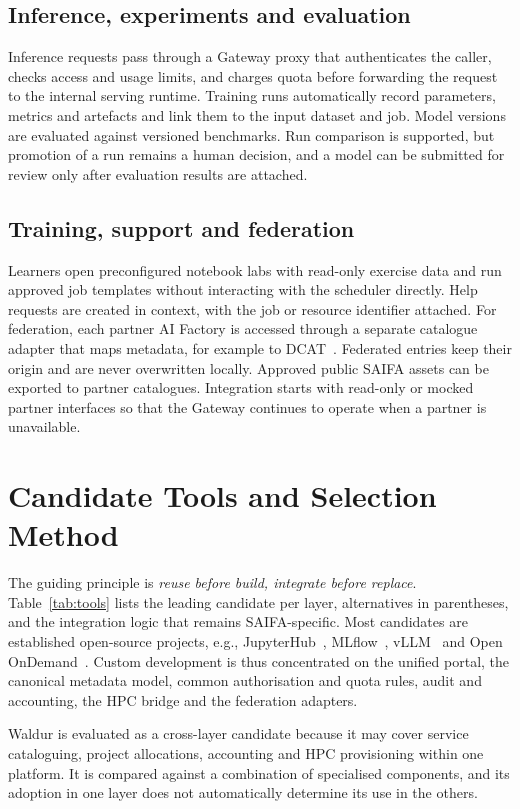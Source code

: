 \documentclass[conference,a4paper]{IEEEtran}
\begin{document}
\subsection{Inference, experiments and evaluation}
Inference requests pass through a Gateway proxy that authenticates the caller, checks access and usage limits, and charges quota before forwarding the request to the internal serving runtime. Training runs automatically record parameters, metrics and artefacts and link them to the input dataset and job. Model versions are evaluated against versioned benchmarks. Run comparison is supported, but promotion of a run remains a human decision, and a model can be submitted for review only after evaluation results are attached.

\subsection{Training, support and federation}
Learners open preconfigured notebook labs with read-only exercise data and run approved job templates without interacting with the scheduler directly. Help requests are created in context, with the job or resource identifier attached. For federation, each partner AI Factory is accessed through a separate catalogue adapter that maps metadata, for example to DCAT~\cite{w3c_dcat3}. Federated entries keep their origin and are never overwritten locally. Approved public SAIFA assets can be exported to partner catalogues. Integration starts with read-only or mocked partner interfaces so that the Gateway continues to operate when a partner is unavailable.

\section{Candidate Tools and Selection Method}

The guiding principle is \emph{reuse before build, integrate before replace}. Table~\ref{tab:tools} lists the leading candidate per layer, alternatives in parentheses, and the integration logic that remains SAIFA-specific. Most candidates are established open-source projects, e.g., JupyterHub~\cite{kluyver2016jupyter}, MLflow~\cite{zaharia2018mlflow}, vLLM~\cite{kwon2023vllm} and Open OnDemand~\cite{hudak2018ood}. Custom development is thus concentrated on the unified portal, the canonical metadata model, common authorisation and quota rules, audit and accounting, the HPC bridge and the federation adapters.

Waldur is evaluated as a cross-layer candidate because it may cover service cataloguing, project allocations, accounting and HPC provisioning within one platform. It is compared against a combination of specialised components, and its adoption in one layer does not automatically determine its use in the others.
\end{document}
